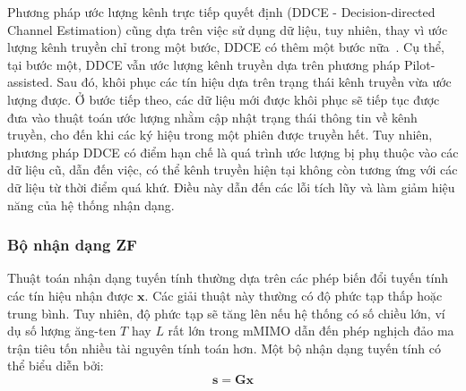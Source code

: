 Phương pháp ước lượng kênh trực tiếp quyết định (DDCE - Decision-directed Channel Estimation) cũng dựa trên việc sử dụng dữ liệu, tuy nhiên, thay vì ước lượng kênh truyền chỉ trong một bước, DDCE có thêm một bước nữa~\cite{vilas2022}. Cụ thể, tại bước một, DDCE vẫn ước lượng kênh truyền dựa trên 
phương pháp 
Pilot-assisted.
Sau đó, khôi phục các tín hiệu dựa trên trạng thái kênh truyền vừa ước lượng được. Ở bước tiếp theo, các dữ liệu mới được khôi phục sẽ tiếp tục được đưa vào thuật toán ước lượng nhằm cập nhật trạng thái thông tin về kênh truyền, cho đến khi các ký hiệu trong một phiên được truyền hết. 
Tuy nhiên, phương pháp DDCE có điểm hạn chế là quá trình ước lượng bị phụ thuộc vào các dữ liệu cũ, dẫn đến việc, có thể kênh truyền hiện tại không còn tương ứng với các dữ liệu từ thời điểm quá khứ. Điều này dẫn đến các lỗi tích lũy và làm giảm hiệu năng của hệ thống nhận dạng.

\subsubsection*{\textbf{Bộ nhận dạng ZF}} \label{sec:zf}

Thuật toán nhận dạng tuyến tính thường dựa trên các phép biến đổi tuyến tính các tín hiệu nhận được $\mathbf{x}$. Các giải thuật này thường có độ phức tạp thấp hoặc trung bình. Tuy nhiên, độ phức tạp sẽ tăng lên nếu hệ thống có số chiều lớn, ví dụ số lượng ăng-ten $T$ hay $L$ rất lớn trong mMIMO dẫn đến phép nghịch đảo ma trận tiêu tốn nhiều tài nguyên tính toán hơn. Một bộ nhận dạng tuyến tính có thể biểu diễn bởi:
\begin{equation}
    \mathbf{s} = \mathbf{G} \mathbf{x}
\end{equation}

